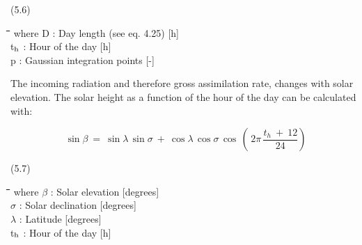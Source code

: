  
\strut\hfill (5.6)
\nwln
\begin{tabbing}
\hspace{1.27cm}\=\hspace{1.27cm}\=\hspace{1.27cm}\=\hspace{1.27cm}\=%
\hspace{1.27cm}\=\hspace{1.27cm}\=\hspace{1.27cm}\=\hspace{1.27cm}\=%
\hspace{1.27cm}\=\hspace{1.27cm}\=\kill
where D : Day length (see eq. 4.25)        [h]\\
t$_{{\rm h}}$ : Hour of the day        [h]\\
p : Gaussian integration points        [-]
\end{tabbing}



The incoming radiation and therefore gross assimilation rate, changes with solar eleva\-tion. The solar height as a function of the hour of the day can be calculated with:

\begin{displaymath}
\sin \beta ~=~ \sin \lambda \, \sin \sigma ~+~ \cos \lambda \, \cos \sigma \, \cos \, (\, 2 \pi \,{\frac{t _{h} ~+~ 12}{24}} )
\end{displaymath}


\strut\hfill (5.7)
\nwln
\begin{tabbing}
\hspace{1.27cm}\=\hspace{1.27cm}\=\hspace{1.27cm}\=\hspace{1.27cm}\=%
\hspace{1.27cm}\=\hspace{1.27cm}\=\hspace{1.27cm}\=\hspace{1.27cm}\=%
\hspace{1.27cm}\=\hspace{1.27cm}\=\kill
where $\beta$ : Solar elevation        [degrees]\\
$\sigma$ : Solar declination        [degrees]\\
$\lambda$ : Latitude        [degrees]\\
t$_{{\rm h}}$ : Hour of the day        [h]
\end{tabbing}




